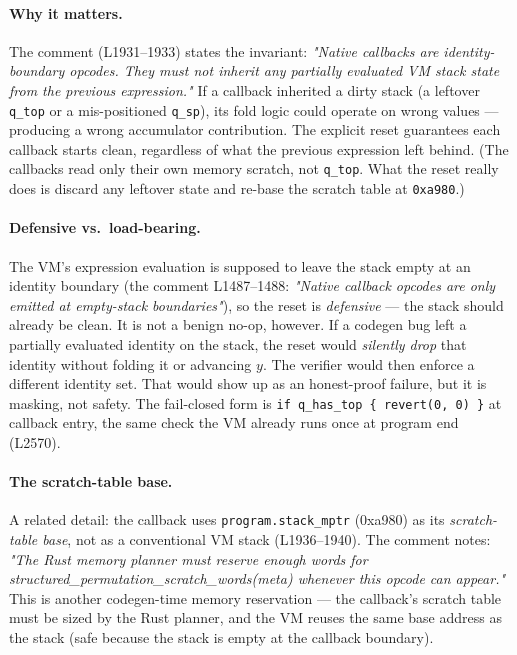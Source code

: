 \paragraph{Why it matters.} The comment (L1931--1933) states the
invariant: \emph{"Native callbacks are identity-boundary opcodes.
They must not inherit any partially evaluated VM stack state from
the previous expression."} If a callback inherited a dirty stack
(a leftover \texttt{q\_top} or a mis-positioned \texttt{q\_sp}),
its fold logic could operate on wrong values --- producing a wrong
accumulator contribution. The explicit reset guarantees each
callback starts clean, regardless of what the previous expression
left behind. (The callbacks read only their own memory scratch, not
\texttt{q\_top}. What the reset really does is discard any leftover
state and re-base the scratch table at \texttt{0xa980}.)

\paragraph{Defensive vs.\ load-bearing.} The VM's expression
evaluation is supposed to leave the stack empty at an identity
boundary (the comment L1487--1488: \emph{"Native callback opcodes
are only emitted at empty-stack boundaries"}), so the reset is
\emph{defensive} --- the stack should already be clean.
 It is not a benign no-op, however. If a codegen
bug left a partially evaluated identity on the stack, the reset
would \emph{silently drop} that identity without folding it or
advancing $y$. The verifier would then enforce a different identity
set. That would show up as an honest-proof failure, but it is
masking, not safety. The fail-closed form is
\texttt{if q\_\allowbreak{}has\_\allowbreak{}top \{ revert(0, 0) \}} at callback entry, the
same check the VM already runs once at program end (L2570).

\paragraph{The scratch-table base.} A related detail: the callback
uses \texttt{program.stack\_\allowbreak{}mptr} (0xa980) as its
\emph{scratch-table base}, not as a conventional VM stack
(L1936--1940). The comment notes: \emph{"The Rust memory planner
must reserve enough words for
structured\_permutation\_scratch\_words(meta) whenever this opcode
can appear."} This is another codegen-time memory reservation ---
the callback's scratch table must be sized by the Rust planner, and
the VM reuses the same base address as the stack (safe because the
stack is empty at the callback boundary).

